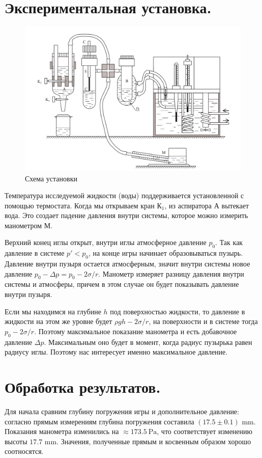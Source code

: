 \documentclass[a4paper,12pt]{report}
\begin{document}
\begin{multicols}{2}
        \section{Экспериментальная установка.}
        \begin{figure}[H]
            \centering
            \includegraphics[width=\columnwidth]{../img/ustanovka.png}
            \caption{Схема установки}
        \end{figure}
        Температура исследуемой жидкости (воды) поддерживается установленной с помощью термостата. Когда мы открываем кран К$_1$, из аспиратора А вытекает вода. Это создает падение давления внутри системы, которое можно измерить манометром М.

        Верхний конец иглы открыт, внутри иглы атмосферное давление $p_0$. Так как давление в системе $p'<p_0$, на конце игры начинает образовываться пузырь. Давление внутри пузыря остается атмосферным, значит внутри системы новое давление $p_0-\Delta p=p_0-2\sigma/r$. Манометр измеряет разницу давления внутри системы и атмосферы, причем в этом случае он будет показывать давление внутри пузыря.

        Если мы находимся на глубине $h$ под поверхностью жидкости, то давление в жидкости на этом же уровне будет $\rho g h -2\sigma/r$, на поверхности и в системе тогда $p_0-2\sigma/r$. Поэтому максимальное показание манометра и есть добавочное давление $\Delta p$. Максимальным оно будет в момент, когда радиус пузырька равен радиусу иглы. Поэтому нас интересует именно максимальное давление.
        \newcolumn
        \section{Обработка результатов.}
        Для начала сравним глубину погружения игры и дополнительное давление: согласно прямым измерениям глубина погружения составила $(17.5\pm 0.1)$ mm. Показания манометра изменились на $\approx 173.5 \ \text{Pa}$, что соответствует изменению высоты $17.7$ mm. Значения, полученные прямым и косвенным образом хорошо соотносятся.


\end{multicols}
\end{document}
